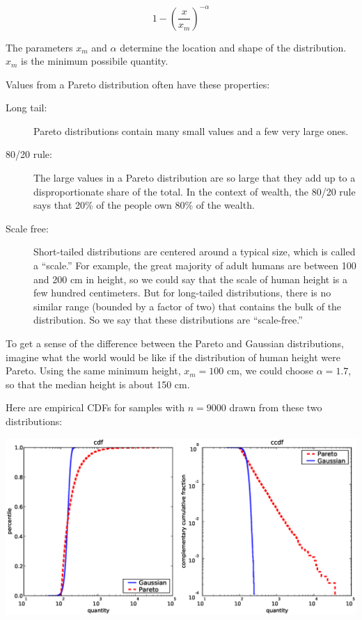 \documentclass[10pt]{book}
\begin{document}
\[ 1- \left( \frac{x}{x_m} \right) ^{-\alpha} \]

The parameters $x_m$ and $\alpha$ determine the location and shape of
the distribution.  $x_m$ is the minimum possibile quantity.

Values from a Pareto distribution often have these properties:

\begin{description}

\item[Long tail:] Pareto distributions contain many small values
and a few very large ones.  

\item[80/20 rule:] The large values in a Pareto distribution are
so large that they add up to a disproportionate share of the total.
In the context of wealth, the 80/20 rule says that 20\% of the
people own 80\% of the wealth.

\item[Scale free:] Short-tailed distributions are centered around
a typical size, which is called a ``scale.''  For example, the
great majority of adult humans are between 100 and 200 cm in height,
so we could say that the scale of human height is a few hundred
centimeters.  But for long-tailed distributions, there is no
similar range (bounded by a factor of two) that contains the
bulk of the distribution.  So we say that these distributions
are ``scale-free.''

\end{description}

To get a sense of the difference between the Pareto and Gaussian
distributions, imagine what the world would be like if the
distribution of human height were Pareto.  Using the same minimum
height, $x_m = 100$ cm, we could choose $\alpha = 1.7$, so that the median
height is about 150 cm.

Here are empirical CDFs for samples with $n=9000$ drawn 
from these two distributions:

\beforefig
\centerline{\includegraphics[width=5.5in]{figs/height_cdf.eps}}
\afterfig
\end{document}
